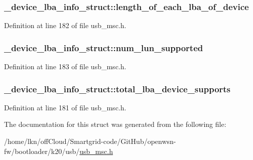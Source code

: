 \subsubsection[{\texorpdfstring{length\+\_\+of\+\_\+each\+\_\+lba\+\_\+of\+\_\+device}{length_of_each_lba_of_device}}]{ \+\_\+device\+\_\+lba\+\_\+info\+\_\+struct\+::length\+\_\+of\+\_\+each\+\_\+lba\+\_\+of\+\_\+device}\hypertarget{struct__device__lba__info__struct_a7d8325efedba22b20ce7ad4097d6f745}{}\label{struct__device__lba__info__struct_a7d8325efedba22b20ce7ad4097d6f745}


Definition at line 182 of file usb\+\_\+msc.\+h.

\subsubsection[{\texorpdfstring{num\+\_\+lun\+\_\+supported}{num_lun_supported}}]{ \+\_\+device\+\_\+lba\+\_\+info\+\_\+struct\+::num\+\_\+lun\+\_\+supported}\hypertarget{struct__device__lba__info__struct_a783c732f2cab51adf42234e5604e19ca}{}\label{struct__device__lba__info__struct_a783c732f2cab51adf42234e5604e19ca}


Definition at line 183 of file usb\+\_\+msc.\+h.

\subsubsection[{\texorpdfstring{total\+\_\+lba\+\_\+device\+\_\+supports}{total_lba_device_supports}}]{ \+\_\+device\+\_\+lba\+\_\+info\+\_\+struct\+::total\+\_\+lba\+\_\+device\+\_\+supports}\hypertarget{struct__device__lba__info__struct_a9d222becf4aee43e8069564b711482ed}{}\label{struct__device__lba__info__struct_a9d222becf4aee43e8069564b711482ed}


Definition at line 181 of file usb\+\_\+msc.\+h.



The documentation for this struct was generated from the following file\+:\begin{DoxyCompactItemize}
\item 
/home/lkn/off\+Cloud/\+Smartgrid-\/code/\+Git\+Hub/openwsn-\/fw/bootloader/k20/usb/\hyperlink{usb__msc_8h}{usb\+\_\+msc.\+h}\end{DoxyCompactItemize}

